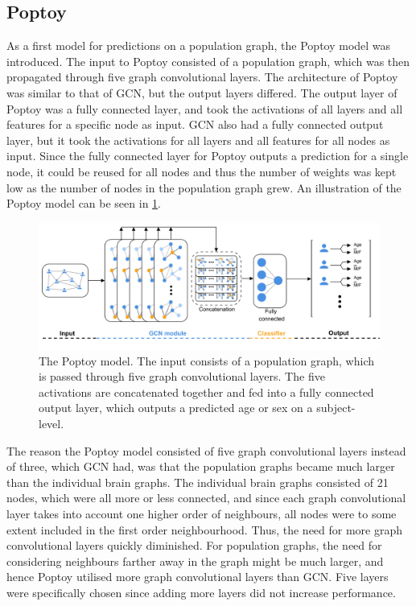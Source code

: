 \subsection{Poptoy}

As a first model for predictions on a population graph, the Poptoy model was introduced. The input to Poptoy consisted of a population graph, which was then propagated through five graph convolutional layers. The architecture of Poptoy was similar to that of GCN, but the output layers differed. The output layer of Poptoy was a fully connected layer, and took the activations of all layers and all features for a specific node as input. GCN also had a fully connected output layer, but it took the activations for all layers and all features for all nodes as input. Since the fully connected layer for Poptoy outputs a prediction for a single node, it could be reused for all nodes and thus the number of weights was kept low as the number of nodes in the population graph grew. An illustration of the Poptoy model can be seen in \cref{fig:poptoy}.

\begin{figure}[!htbp]
    \centering
    \includegraphics[width=\textwidth]{chapters/images_methods/poptoy_v2.png}
    \caption{The Poptoy model. The input consists of a population graph, which is passed through five graph convolutional layers. The five activations are concatenated together and fed into a fully connected output layer, which outputs a predicted age or sex on a subject-level.}
    \label{fig:poptoy}
\end{figure}

The reason the Poptoy model consisted of five graph convolutional layers instead of three, which GCN had, was that the population graphs became much larger than the individual brain graphs. The individual brain graphs consisted of 21 nodes, which were all more or less connected, and since each graph convolutional layer takes into account one higher order of neighbours, all nodes were to some extent included in the first order neighbourhood. Thus, the need for more graph convolutional layers quickly diminished. For population graphs, the need for considering neighbours farther away in the graph might be much larger, and hence Poptoy utilised more graph convolutional layers than GCN. Five layers were specifically chosen since adding more layers did not increase performance.

